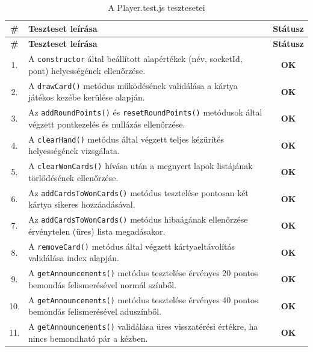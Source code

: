 \vspace{1em}
\begin{longtable}{| c | m{11.5cm} | c |}
    \caption{A Player.test.js tesztesetei}
    \label{tab:test_player} \\
    \hline
    \textbf{\#} & \textbf{Teszteset leírása} & \textbf{Státusz} \\
    \hline
    \endfirsthead
    \hline
    \textbf{\#} & \textbf{Teszteset leírása} & \textbf{Státusz} \\
    \hline
    \endhead
    \hline
    \endlastfoot

    1. & A \texttt{constructor} által beállított alapértékek (név, socketId, pont) helyességének ellenőrzése. & \cellcolor{green!40}\textbf{OK} \\ \hline
    2. & A \texttt{drawCard()} metódus működésének validálása a kártya játékos kezébe kerülése alapján. & \cellcolor{green!40}\textbf{OK} \\ \hline
    3. & Az \texttt{addRoundPoints()} és \texttt{resetRoundPoints()} metódusok által végzett pontkezelés és nullázás ellenőrzése. & \cellcolor{green!40}\textbf{OK} \\ \hline
    4. & A \texttt{clearHand()} metódus által végzett teljes kézürítés helyességének vizsgálata. & \cellcolor{green!40}\textbf{OK} \\ \hline
    5. & A \texttt{clearWonCards()} hívása után a megnyert lapok listájának törlődésének ellenőrzése. & \cellcolor{green!40}\textbf{OK} \\ \hline
    6. & Az \texttt{addCardsToWonCards()} metódus tesztelése pontosan két kártya sikeres hozzáadásával. & \cellcolor{green!40}\textbf{OK} \\ \hline
    7. & Az \texttt{addCardsToWonCards()} metódus hibaágának ellenőrzése érvénytelen (üres) lista megadásakor. & \cellcolor{green!40}\textbf{OK} \\ \hline
    8. & A \texttt{removeCard()} metódus által végzett kártyaeltávolítás validálása index alapján. & \cellcolor{green!40}\textbf{OK} \\ \hline
    9. & A \texttt{getAnnouncements()} metódus tesztelése érvényes 20 pontos bemondás felismerésével normál színből. & \cellcolor{green!40}\textbf{OK} \\ \hline
    10. & A \texttt{getAnnouncements()} metódus tesztelése érvényes 40 pontos bemondás felismerésével aduszínből. & \cellcolor{green!40}\textbf{OK} \\ \hline
    11. & A \texttt{getAnnouncements()} validálása üres visszatérési értékre, ha nincs bemondható pár a kézben. & \cellcolor{green!40}\textbf{OK} \\ \hline

\end{longtable}
